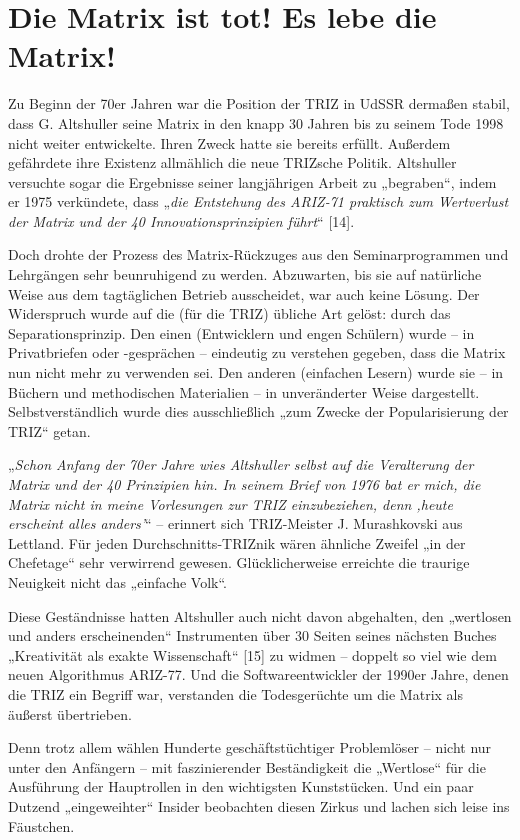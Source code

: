 \documentclass[11pt,a4paper]{article}
\begin{document}
\section*{Die Matrix ist tot! Es lebe die Matrix!}
Zu Beginn der 70er Jahren war die Position der TRIZ in UdSSR dermaßen stabil,
dass G. Altshuller seine Matrix in den knapp 30 Jahren bis zu seinem Tode 1998
nicht weiter entwickelte. Ihren Zweck hatte sie bereits erfüllt. Außerdem
gefährdete ihre Existenz allmählich die neue TRIZsche Politik. Altshuller
versuchte sogar die Ergebnisse seiner langjährigen Arbeit zu „begraben“, indem
er 1975 verkündete, dass „\emph{die Entstehung des ARIZ-71 praktisch zum
  Wertverlust der Matrix und der 40 Innovationsprinzipien führt}“ [14].

Doch drohte der Prozess des Matrix-Rückzuges aus den Seminarprogrammen und
Lehrgängen sehr beunruhigend zu werden. Abzuwarten, bis sie auf natürliche
Weise aus dem tagtäglichen Betrieb ausscheidet, war auch keine Lösung. Der
Widerspruch wurde auf die (für die TRIZ) übliche Art gelöst: durch das
Separationsprinzip. Den einen (Entwicklern und engen Schülern) wurde – in
Privatbriefen oder -gesprächen – eindeutig zu verstehen gegeben, dass die
Matrix nun nicht mehr zu verwenden sei. Den anderen (einfachen Lesern) wurde
sie – in Büchern und methodischen Materialien – in unveränderter Weise
dargestellt.  Selbstverständlich wurde dies ausschließlich „zum Zwecke der
Popularisierung der TRIZ“ getan.

„\emph{Schon Anfang der 70er Jahre wies Altshuller selbst auf die Veralterung
  der Matrix und der 40 Prinzipien hin. In seinem Brief von 1976 bat er mich,
  die Matrix nicht in meine Vorlesungen zur TRIZ einzubeziehen, denn ‚heute
  erscheint alles anders’}“ – erinnert sich TRIZ-Meister J. Murashkovski aus
Lettland. Für jeden Durchschnitts-TRIZnik wären ähnliche Zweifel „in der
Chefetage“ sehr verwirrend gewesen. Glücklicherweise erreichte die traurige
Neuigkeit nicht das „einfache Volk“.

Diese Geständnisse hatten Altshuller auch nicht davon abgehalten, den
„wertlosen und anders erscheinenden“ Instrumenten über 30 Seiten seines
nächsten Buches „Kreativität als exakte Wissenschaft“ [15] zu widmen – doppelt
so viel wie dem neuen Algorithmus ARIZ-77. Und die Softwareentwickler der
1990er Jahre, denen die TRIZ ein Begriff war, verstanden die Todesgerüchte um
die Matrix als äußerst übertrieben.

Denn trotz allem wählen Hunderte geschäftstüchtiger Problemlöser – nicht nur
unter den Anfängern – mit faszinierender Beständigkeit die „Wertlose“ für die
Ausführung der Hauptrollen in den wichtigsten Kunststücken. Und ein paar
Dutzend „eingeweihter“ Insider beobachten diesen Zirkus und lachen sich leise
ins Fäustchen.
\end{document}

